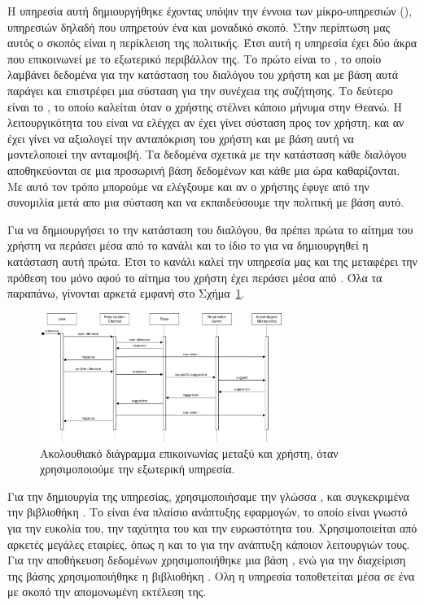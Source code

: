 Η υπηρεσία αυτή δημιουργήθηκε έχοντας υπόψιν την έννοια των μίκρο-υπηρεσιών (), υπηρεσιών δηλαδή που υπηρετούν ένα και μοναδικό σκοπό. Στην περίπτωση μας αυτός ο σκοπός είναι η περίκλειση της πολιτικής. Έτσι αυτή η υπηρεσία έχει δύο άκρα που επικοινωνεί με το εξωτερικό περιβάλλον της. Το πρώτο είναι το , το οποίο λαμβάνει δεδομένα για την κατάσταση του διαλόγου του χρήστη και με βάση αυτά παράγει και επιστρέφει μια σύσταση για την συνέχεια της συζήτησης. Το δεύτερο είναι το , το οποίο καλείται όταν ο χρήστης στέλνει κάποιο μήνυμα στην Θεανώ. Η λειτουργικότητα του είναι να ελέγχει αν έχει γίνει σύσταση προς τον χρήστη, και αν έχει γίνει να αξιολογεί την ανταπόκριση του χρήστη και με βάση αυτή να μοντελοποιεί την ανταμοιβή. Τα δεδομένα σχετικά με την κατάσταση κάθε διαλόγου αποθηκεύονται σε μια προσωρινή βάση δεδομένων και κάθε μια ώρα καθαρίζονται. Με αυτό τον τρόπο μπορούμε να ελέγξουμε και αν ο χρήστης έφυγε από την συνομιλία μετά απο μια σύσταση και να εκπαιδεύσουμε την πολιτική με βάση αυτό.

Για να δημιουργήσει το  την κατάσταση του διαλόγου, θα πρέπει πρώτα το αίτημα του χρήστη να περάσει μέσα από το κανάλι και το ίδιο το  για να δημιουργηθεί η κατάσταση αυτή πρώτα. Έτσι το κανάλι καλεί την υπηρεσία μας και της μεταφέρει την πρόθεση του μόνο αφού το αίτημα του χρήστη έχει περάσει μέσα από . Όλα τα παραπάνω, γίνονται αρκετά εμφανή στο Σχήμα~\ref{fig:rasa_sequence_smart_suggest_ms}.

\begin{figure}
    \centering
    \includegraphics[width=0.7\textwidth]{body_matter/our_work/images/Rasa_smart_service.png}
    \caption{Ακολουθιακό διάγραμμα επικοινωνίας μεταξύ  και χρήστη, όταν χρησιμοποιούμε την εξωτερική υπηρεσία.}
    \label{fig:rasa_sequence_smart_suggest_ms}
\end{figure}

Για την δημιουργία της υπηρεσίας, χρησιμοποιήσαμε την γλώσσα , και συγκεκριμένα την βιβλιοθήκη . Το  είναι ένα πλαίσιο ανάπτυξης  εφαρμογών, το οποίο είναι γνωστό για την ευκολία του, την ταχύτητα του και την ευρωστότητα του. Χρησιμοποιείται από αρκετές μεγάλες εταιρίες, όπως η  και το  για την ανάπτυξη κάποιον λειτουργιών τους. Για την αποθήκευση δεδομένων χρησιμοποιήθηκε μια βάση , ενώ για την διαχείριση της βάσης χρησιμοποιήθηκε η βιβλιοθήκη . Ολη η υπηρεσία τοποθετείται μέσα σε ένα  με σκοπό την απομονωμένη εκτέλεση της.
